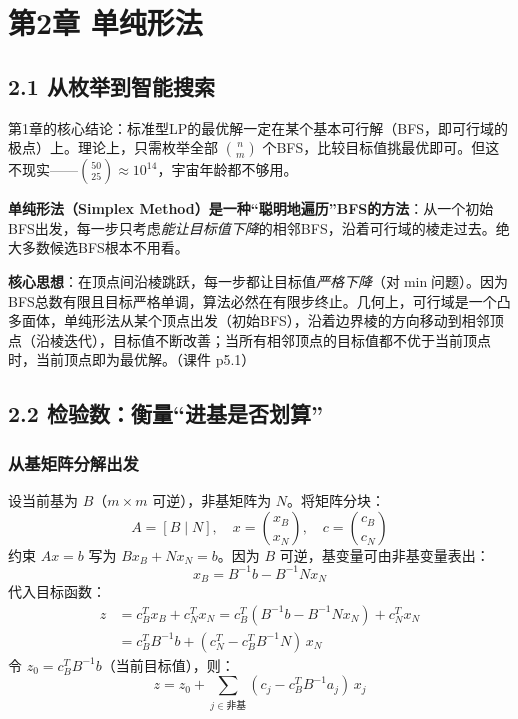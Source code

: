 \section{第2章 \quad 单纯形法}

\subsection{2.1 从枚举到智能搜索}

第1章的核心结论：标准型LP的最优解一定在某个基本可行解（BFS，即可行域的极点）上。理论上，只需枚举全部 $\binom{n}{m}$ 个BFS，比较目标值挑最优即可。但这不现实——$\binom{50}{25}\approx 10^{14}$，宇宙年龄都不够用。

\textbf{单纯形法（Simplex Method）是一种“聪明地遍历”BFS的方法}：从一个初始BFS出发，每一步只考虑\emph{能让目标值下降}的相邻BFS，沿着可行域的棱走过去。绝大多数候选BFS根本不用看。

\textbf{核心思想}：在顶点间沿棱跳跃，每一步都让目标值\emph{严格下降}（对$\min$问题）。因为BFS总数有限且目标严格单调，算法必然在有限步终止。几何上，可行域是一个凸多面体，单纯形法从某个顶点出发（初始BFS），沿着边界棱的方向移动到相邻顶点（沿棱迭代），目标值不断改善；当所有相邻顶点的目标值都不优于当前顶点时，当前顶点即为最优解。（课件 p5.1）

\subsection{2.2 检验数：衡量“进基是否划算”}

\subsubsection{从基矩阵分解出发}

设当前基为 $B$（$m\times m$ 可逆），非基矩阵为 $N$。将矩阵分块：
\[
A = [B \mid N],\quad x = \binom{x_B}{x_N},\quad c = \binom{c_B}{c_N}
\]
约束 $Ax=b$ 写为 $Bx_B + Nx_N = b$。因为 $B$ 可逆，基变量可由非基变量表出：
\[
x_B = B^{-1}b - B^{-1}N x_N
\]
代入目标函数：
\[
\begin{aligned}
z &= c_B^T x_B + c_N^T x_N
   = c_B^T(B^{-1}b - B^{-1}N x_N) + c_N^T x_N \\
  &= c_B^T B^{-1}b + (c_N^T - c_B^T B^{-1}N)\,x_N
\end{aligned}
\]
令 $z_0 = c_B^T B^{-1}b$（当前目标值），则：
\[
z = z_0 + \sum_{j \in \text{非基}} (c_j - c_B^T B^{-1} a_j)\,x_j
\]

